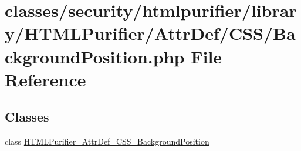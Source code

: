 \hypertarget{BackgroundPosition_8php}{\section{classes/security/htmlpurifier/library/\+H\+T\+M\+L\+Purifier/\+Attr\+Def/\+C\+S\+S/\+Background\+Position.php File Reference}
\label{BackgroundPosition_8php}
}
\subsection*{Classes}
\begin{DoxyCompactItemize}
\item 
class \hyperlink{classHTMLPurifier__AttrDef__CSS__BackgroundPosition}{H\+T\+M\+L\+Purifier\+\_\+\+Attr\+Def\+\_\+\+C\+S\+S\+\_\+\+Background\+Position}
\end{DoxyCompactItemize}

